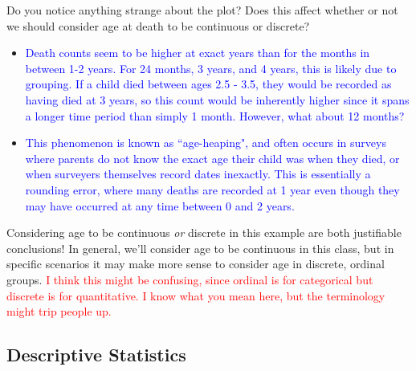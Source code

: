 \documentclass[10pt,t]{beamer}
\begin{document}
\begin{frame}

	
Do you notice anything strange about the plot? Does this affect whether or not we should consider age at death to be continuous or discrete?
	
	\vspace{0.3cm}
	
\begin{itemize}
	\item[] \small \textcolor{blue}{Death counts seem to be higher at exact years than for the months in between 1-2 years. For 24 months, 3 years, and 4 years, this is likely due to grouping. If a child died between ages 2.5 - 3.5, they would be recorded as having died at 3 years, so this count would be inherently higher since it spans a longer time period than simply 1 month. However, what about 12 months?} 
	
	\vspace{0.3cm}
	
	\item[] \small \textcolor{blue}{This phenomenon is known as ``age-heaping", and often occurs in surveys where parents do not know the exact age their child was when they died, or when surveyers themselves record dates inexactly. This is essentially a rounding error, where many deaths are recorded at 1 year even though they may have occurred at any time between 0 and 2 years. }
\end{itemize}	
	
	

	\vspace{0.3cm}

Considering age to be continuous \textit{or} discrete in this example are both justifiable conclusions! In general, we'll consider age to be continuous in this class, but in specific scenarios it may make more sense to consider age in discrete, ordinal groups. \textcolor{red}{I think this might be confusing, since ordinal is for categorical but discrete is for quantitative. I know what you mean here, but the terminology might trip people up.}

\end{frame}

\subsection{Descriptive Statistics}
\end{document}
